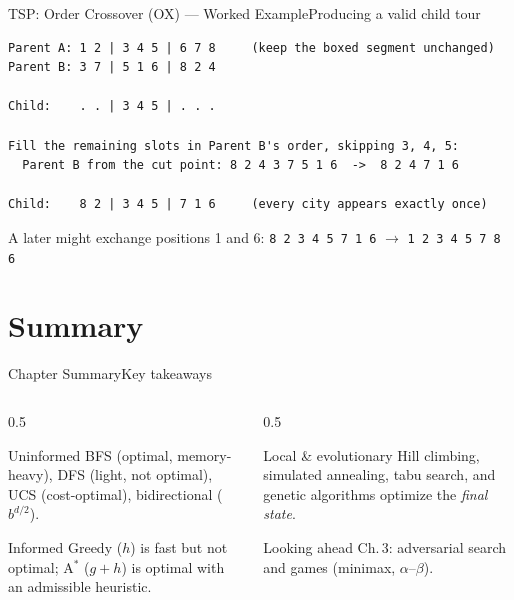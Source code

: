 \documentclass[aspectratio=169,11pt]{beamer}
\begin{document}
\begin{frame}[fragile]{TSP: Order Crossover (OX) — Worked Example}{Producing a valid child tour}
\begin{lstlisting}[language={}, basicstyle=\ttfamily\scriptsize, numbers=none,
                   xleftmargin=0.5em, framexleftmargin=0.5em]
Parent A: 1 2 | 3 4 5 | 6 7 8     (keep the boxed segment unchanged)
Parent B: 3 7 | 5 1 6 | 8 2 4

Child:    . . | 3 4 5 | . . .

Fill the remaining slots in Parent B's order, skipping 3, 4, 5:
  Parent B from the cut point: 8 2 4 3 7 5 1 6  ->  8 2 4 7 1 6

Child:    8 2 | 3 4 5 | 7 1 6     (every city appears exactly once)
\end{lstlisting}
\centering\scriptsize
A later  might exchange positions 1 and 6:
\texttt{8 2 3 4 5 7 1 6} $\to$ \texttt{1 2 3 4 5 7 8 6}
\end{frame}

\section{Summary}

\begin{frame}{Chapter Summary}{Key takeaways}
  \begin{columns}[T]
    \begin{column}{0.5\textwidth}
      \begin{block}{Uninformed}
        \small BFS (optimal, memory-heavy), DFS (light, not optimal),
        UCS (cost-optimal), bidirectional ($b^{d/2}$).
      \end{block}
      \begin{block}{Informed}
        \small Greedy ($h$) is fast but not optimal; A$^\ast$ ($g{+}h$) is optimal
        with an admissible heuristic.
      \end{block}
    \end{column}
    \begin{column}{0.5\textwidth}
      \begin{exampleblock}{Local \& evolutionary}
        \small Hill climbing, simulated annealing, tabu search, and genetic
        algorithms optimize the \emph{final state}.
      \end{exampleblock}
      \begin{alertblock}{Looking ahead}
        \small Ch.\,3: adversarial search and games (minimax, $\alpha$–$\beta$).
      \end{alertblock}
    \end{column}
  \end{columns}
\end{frame}
\end{document}
